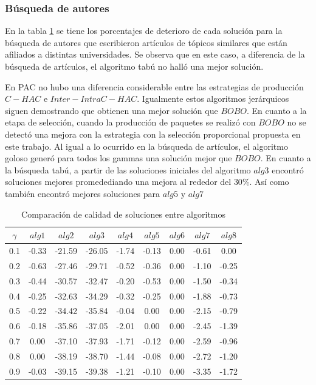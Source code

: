 \subsubsection{Búsqueda de autores}
En la tabla \ref{tabla:comp2} se tiene los porcentajes de deterioro de cada solución para la búsqueda de autores que escribieron artículos de tópicos similares que están afiliados a distintas universidades. Se observa que en este caso, a diferencia de la búsqueda de artículos, el algoritmo tabú no halló una mejor solución.

En PAC no hubo una diferencia considerable entre las estrategias de producción $C-HAC$ e $Inter-Intra C-HAC$. Igualmente estos algoritmos jerárquicos siguen demostrando que obtienen una mejor solución que $BOBO$. En cuanto a la etapa de selección, cuando la producción de paquetes se realizó con $BOBO$ no se detectó una mejora con la estrategia con la selección proporcional propuesta en este trabajo. Al igual a lo ocurrido en la búsqueda de artículos, el algoritmo goloso generó para todos los gammas una solución mejor que $BOBO$. En cuanto a la búsqueda tabú, a partir de las soluciones iniciales del algoritmo $alg3$ encontró soluciones mejores promedediando una mejora al rededor del $30\%$. Así como también encontró mejores soluciones para $alg5$ y $alg7$

\begin{table}[H]
\begin{center}
\begin{tabular}{|c|c|c|c|c|c|c|c|c|}
\hline
$\gamma$&$alg1$&$alg2$&$alg3$&$alg4$&$alg5$&$alg6$&$alg7$&$alg8$ \\ \hline
0.1 & -0.33 & -21.59 & -26.05 & -1.74 & -0.13 & 0.00 & -0.61 & 0.00 \\
0.2 & -0.63 & -27.46 & -29.71 & -0.52 & -0.36 & 0.00 & -1.10 & -0.25 \\
0.3 & -0.44 & -30.57 & -32.47 & -0.20 & -0.53 & 0.00 & -1.50 & -0.34 \\
0.4 & -0.25 & -32.63 & -34.29 & -0.32 & -0.25 & 0.00 & -1.88 & -0.73 \\
0.5 & -0.22 & -34.42 & -35.84 & -0.04 & 0.00 & 0.00 & -2.15 & -0.79 \\
0.6 & -0.18 & -35.86 & -37.05 & -2.01 & 0.00 & 0.00 & -2.45 & -1.39 \\
0.7 & 0.00 & -37.10 & -37.93 & -1.71 & -0.12 & 0.00 & -2.59 & -0.96 \\ 
0.8 & 0.00 & -38.19 & -38.70 & -1.44 & -0.08 & 0.00 & -2.72 & -1.20 \\
0.9 & -0.03 & -39.15 & -39.38 & -1.21 & -0.10 & 0.00 & -3.35 & -1.72 \\ \hline 
\end{tabular}
\caption{Comparación de calidad de soluciones entre algoritmos} 
\label{tabla:comp2}
\end{center}
\end{table}

